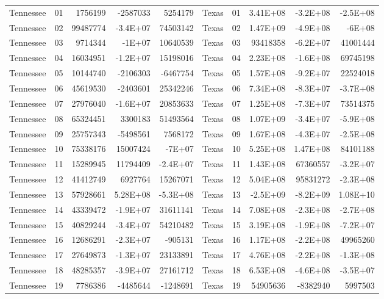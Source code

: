 \begin{landscape}
\begin{singlespace}
\begin{longtable}{lrrrr|lrrrr}
		Tennessee &  01  & 1756199 & -2587033 & 5254179 & Texas &  01  & 3.41E+08 & -3.2E+08 & -2.5E+08 \\
		Tennessee &  02  & 99487774 & -3.4E+07 & 74503142 & Texas &  02  & 1.47E+09 & -4.9E+08 & -6E+08 \\
		Tennessee &  03  & 9714344 & -1E+07 & 10640539 & Texas &  03  & 93418358 & -6.2E+07 & 41001444 \\
		Tennessee &  04  & 16034951 & -1.2E+07 & 15198016 & Texas &  04  & 2.23E+08 & -1.6E+08 & 69745198 \\
		Tennessee &  05  & 10144740 & -2106303 & -6467754 & Texas &  05  & 1.57E+08 & -9.2E+07 & 22524018 \\
		Tennessee &  06  & 45619530 & -2403601 & 25342246 & Texas &  06  & 7.34E+08 & -8.3E+07 & -3.7E+08 \\
		Tennessee &  07  & 27976040 & -1.6E+07 & 20853633 & Texas &  07  & 1.25E+08 & -7.3E+07 & 73514375 \\
		Tennessee &  08  & 65324451 & 3300183 & 51493564 & Texas &  08  & 1.07E+09 & -3.4E+07 & -5.9E+08 \\
		Tennessee &  09  & 25757343 & -5498561 & 7568172 & Texas &  09  & 1.67E+08 & -4.3E+07 & -2.5E+08 \\
		Tennessee &  10 & 75338176 & 15007424 & -7E+07 & Texas &  10 & 5.25E+08 & 1.47E+08 & 84101188 \\
		Tennessee &  11 & 15289945 & 11794409 & -2.4E+07 & Texas &  11 & 1.43E+08 & 67360557 & -3.2E+07 \\
		Tennessee &  12 & 41412749 & 6927764 & 15267071 & Texas &  12 & 5.04E+08 & 95831272 & -2.3E+08 \\
		Tennessee &  13 & 57928661 & 5.28E+08 & -5.3E+08 & Texas &  13 & -2.5E+09 & -8.2E+09 & 1.08E+10 \\
		Tennessee &  14 & 43339472 & -1.9E+07 & 31611141 & Texas &  14 & 7.08E+08 & -2.3E+08 & -2.7E+08 \\
		Tennessee &  15 & 40829244 & -3.4E+07 & 54210482 & Texas &  15 & 3.19E+08 & -1.9E+08 & -7.2E+07 \\
		Tennessee &  16 & 12686291 & -2.3E+07 & -905131 & Texas &  16 & 1.17E+08 & -2.2E+08 & 49965260 \\
		Tennessee &  17 & 27649873 & -1.3E+07 & 23133891 & Texas &  17 & 4.76E+08 & -2.2E+08 & -1.3E+08 \\
		Tennessee &  18 & 48285357 & -3.9E+07 & 27161712 & Texas &  18 & 6.53E+08 & -4.6E+08 & -3.5E+07 \\
		Tennessee &  19 & 7786386 & -4485644 & -1248691 & Texas &  19 & 54905636 & -8382940 & 5997503 \\

\end{longtable}
\end{singlespace}
\end{landscape}
